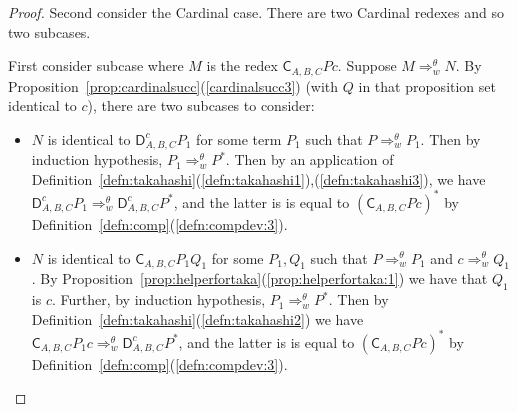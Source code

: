 \documentclass{lmcs} %
\newcommand{\param}{\theta}
\newcommand{\Reduces}[2]{\Rightarrow_{#1}^{#2}}
\newcommand{\ctC}[6]{{\mathsf C}_{#1, #2, #3}#4#5#6}
\newcommand{\ctD}[6]{{\mathsf D}^{#1}_{#2, #3, #4}#5#6}
\begin{document}
\begin{proof}
Second consider the Cardinal case. There are two Cardinal redexes and so two subcases. 

First consider subcase where $M$ is the redex $\ctC{A}{B}{C}{P}{c}{}$. Suppose $M\Reduces{w}{\param} N$. By Proposition~\ref{prop:cardinalsucc}(\ref{cardinalsucc3}) (with $Q$ in that proposition set identical to $c$), there are two subcases to consider:
\begin{itemize}[leftmargin=*]
    \item  $N$ is identical to $\ctD{c}{A}{B}{C}{P_1}{}$ for some term $P_1$ such that $P\Reduces{w}{\param} P_1$. Then by induction hypothesis, $P_1\Reduces{w}{\param} P^{\ast}$. Then by an application of Definition~\ref{defn:takahashi}(\ref{defn:takahashi1}),(\ref{defn:takahashi3}), we have $\ctD{c}{A}{B}{C}{P_1}{} \Reduces{w}{\param} \ctD{c}{A}{B}{C}{P^{\ast}}{}$, and the latter is is equal to $(\ctC{A}{B}{C}{P}{c}{})^{\ast}$ by Definition~\ref{defn:comp}(\ref{defn:compdev:3}).
    \item $N$ is identical to $\ctC{A}{B}{C}{P_1}{Q_1}{}$ for some $P_1,Q_1$ such that $P\Reduces{w}{\param} P_1$ and $c\Reduces{w}{\param} Q_1$. By Proposition~\ref{prop:helperfortaka}(\ref{prop:helperfortaka:1}) we have that $Q_1$ is $c$. Further, by induction hypothesis, $P_1\Reduces{w}{\param} P^{\ast}$. Then by Definition~\ref{defn:takahashi}(\ref{defn:takahashi2}) we have $\ctC{A}{B}{C}{P_1}{c}{}\Reduces{w}{\param}  \ctD{c}{A}{B}{C}{P^{\ast}}{}$, and the latter is is equal to $(\ctC{A}{B}{C}{P}{c}{})^{\ast}$ by Definition~\ref{defn:comp}(\ref{defn:compdev:3}).
\end{itemize}


\end{proof}
\end{document}
